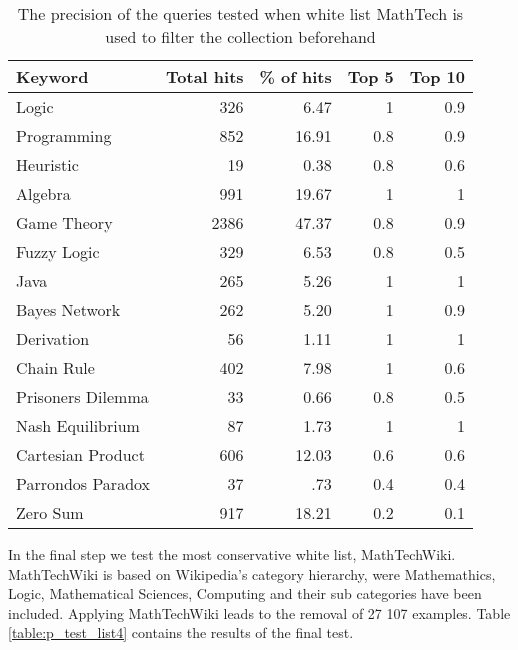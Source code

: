 \begin{table}[H]
\centering
\begin{tabular} {|| p{10em} | r | r | r | r ||} 
 \hline
 Keyword & Total hits & \% of hits & Top 5 & Top 10 \\ [0.5ex] 
 \hline

Logic & 326 & 6.47 & 1 & 0.9 \\
Programming & 852 & 16.91 & 0.8 & 0.9 \\
Heuristic & 19 & 0.38 & 0.8 & 0.6 \\
Algebra & 991 & 19.67 & 1 & 1 \\
Game Theory & 2386 & 47.37 & 0.8 & 0.9 \\
\hline
Fuzzy Logic & 329 & 6.53 & 0.8 & 0.5 \\
Java & 265 & 5.26 & 1 & 1 \\
Bayes Network & 262 & 5.20 & 1 & 0.9 \\
Derivation & 56 & 1.11 & 1 & 1 \\
\hline
Chain Rule & 402 & 7.98 & 1 & 0.6 \\
Prisoners Dilemma & 33 & 0.66 & 0.8 & 0.5 \\
Nash Equilibrium & 87 & 1.73 & 1 & 1 \\
Cartesian Product & 606 & 12.03 & 0.6 & 0.6 \\
Parrondos Paradox & 37 & .73 & 0.4 & 0.4 \\
Zero Sum & 917 & 18.21 & 0.2 & 0.1 \\

 \hline
\end{tabular}
\caption{The precision of the queries tested when white list MathTech is used to filter the collection beforehand}
\label{table:p_test_list3}
\end{table}

In the final step we test the most conservative white list, MathTechWiki. MathTechWiki is based on Wikipedia's category hierarchy, were Mathemathics, Logic, Mathematical Sciences, Computing and their sub categories have been included. Applying MathTechWiki leads to the removal of 27 107 examples. Table \ref{table:p_test_list4} contains the results of the final test. 

